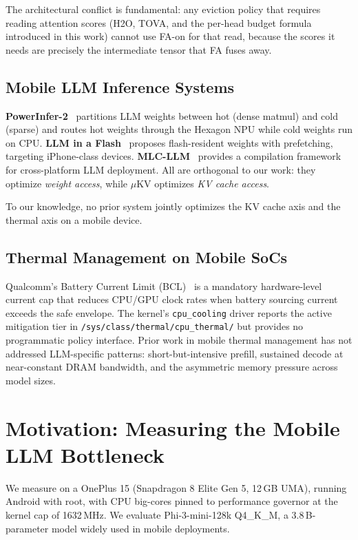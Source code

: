 \documentclass[sigconf, anonymous=false, screen=true]{acmart}
\begin{document}
The architectural conflict is fundamental: any eviction policy that requires reading attention scores (H2O, TOVA, and the per-head budget formula introduced in this work) cannot use FA-on for that read, because the scores it needs are precisely the intermediate tensor that FA fuses away.

\subsection{Mobile LLM Inference Systems}

\textbf{PowerInfer-2}~\cite{song2024powerinfer2} partitions LLM weights between hot (dense matmul) and cold (sparse) and routes hot weights through the Hexagon NPU while cold weights run on CPU. \textbf{LLM in a Flash}~\cite{alizadeh2023llm} proposes flash-resident weights with prefetching, targeting iPhone-class devices. \textbf{MLC-LLM}~\cite{mlcllm} provides a compilation framework for cross-platform LLM deployment. All are orthogonal to our work: they optimize \emph{weight access}, while \textsc{$\mu$KV} optimizes \emph{KV cache access}.

To our knowledge, no prior system jointly optimizes the KV cache axis and the thermal axis on a mobile device.

\subsection{Thermal Management on Mobile SoCs}

Qualcomm's Battery Current Limit (BCL)~\cite{qualcommbcl} is a mandatory hardware-level current cap that reduces CPU/GPU clock rates when battery sourcing current exceeds the safe envelope. The kernel's \texttt{cpu\_cooling} driver reports the active mitigation tier in \texttt{/sys/class/thermal/cpu\_thermal/} but provides no programmatic policy interface. Prior work in mobile thermal management has not addressed LLM-specific patterns: short-but-intensive prefill, sustained decode at near-constant DRAM bandwidth, and the asymmetric memory pressure across model sizes.

\section{Motivation: Measuring the Mobile LLM Bottleneck}
\label{sec:motivation}

We measure on a OnePlus 15 (Snapdragon 8 Elite Gen 5, 12\,GB UMA), running Android with root, with CPU big-cores pinned to performance governor at the kernel cap of 1632\,MHz. We evaluate Phi-3-mini-128k Q4\_K\_M, a 3.8\,B-parameter model widely used in mobile deployments.
\end{document}
